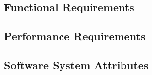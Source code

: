 \documentclass[runningheads,a4paper]{article}
\begin{document}

\subsection{Functional Requirements}

\subsection{Performance Requirements}


\subsection{Software System Attributes}

     
     
\end{document}
